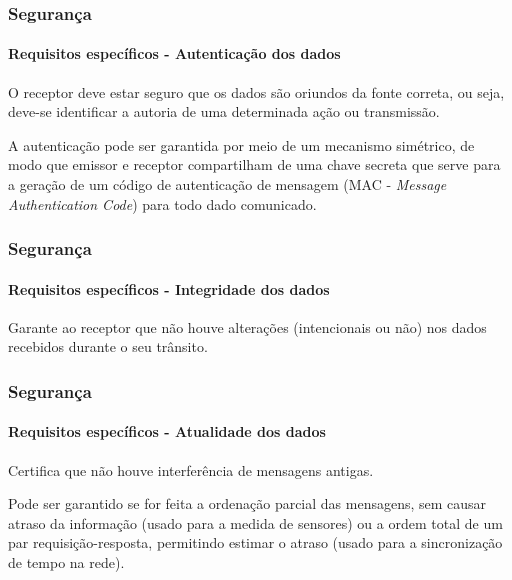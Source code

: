 \documentclass[notes]{beamer}
\begin{document}
\begin{frame}
\frametitle{Segurança}
\framesubtitle{Requisitos específicos - Autenticação dos dados}

\begin{block}

O receptor deve estar seguro que os dados são oriundos da fonte correta, ou seja, deve-se identificar a autoria de uma determinada ação ou transmissão. 

\end{block} \pause

\begin{block}

A autenticação pode ser garantida por meio de um mecanismo simétrico, de modo que emissor e receptor compartilham de uma chave secreta que serve para a geração de um código de autenticação de mensagem (MAC - \textit{Message Authentication Code}) para todo dado comunicado.

\end{block} 

\end{frame}

\begin{frame}
\frametitle{Segurança}
\framesubtitle{Requisitos específicos - Integridade dos dados}

\begin{block}

Garante ao receptor que não houve alterações (intencionais ou não) nos dados recebidos durante o seu trânsito. 

\end{block} 

\end{frame}

\begin{frame}
\frametitle{Segurança}
\framesubtitle{Requisitos específicos - Atualidade dos dados}

\begin{block}

Certifica que não houve interferência de mensagens antigas.

\end{block} \pause

\begin{block}

Pode ser garantido se for feita a ordenação parcial das mensagens, sem causar atraso da informação (usado para a medida de sensores) ou a ordem total de um par requisição-resposta, permitindo estimar o atraso (usado para a sincronização de tempo na rede).  

\end{block} 

\end{frame}
\end{document}
